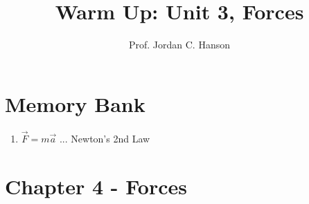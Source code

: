 \documentclass{article}
\begin{document}
\title{Warm Up: Unit 3, Forces}
\author{Prof. Jordan C. Hanson}

\maketitle

\section{Memory Bank}

\begin{enumerate}
\item $\vec{F} = m \vec{a}$ ... Newton's 2nd Law
\end{enumerate}

\section{Chapter 4 - Forces}
\end{document}
